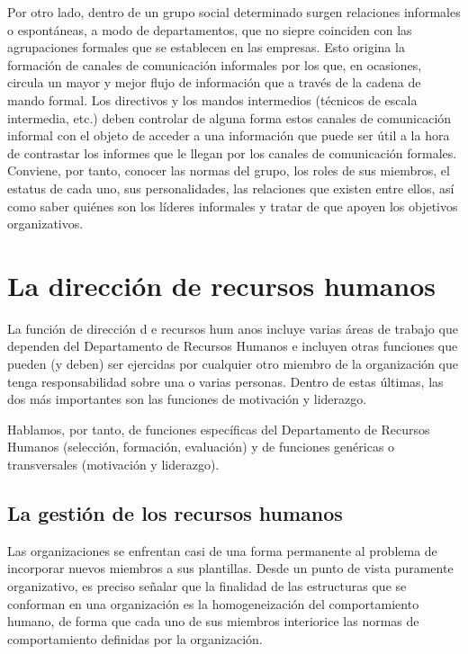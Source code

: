 \documentclass[
]{krantz}
\begin{document}
Por otro lado, dentro de un grupo social determinado surgen relaciones informales o espontáneas, a modo de departamentos, que no siepre coinciden con las agrupaciones formales que se establecen en las empresas. Esto origina la formación de canales de comunicación informales por los que, en ocasiones, circula un mayor y mejor flujo de información que a través de la cadena de mando formal. Los directivos y los mandos intermedios (técnicos de escala intermedia, etc.) deben controlar de alguna forma estos canales de comunicación informal con el objeto de acceder a una información que puede ser útil a la hora de contrastar los informes que le llegan por los canales de comunicación formales. Conviene, por tanto, conocer las normas del grupo, los roles de sus miembros, el estatus de cada uno, sus personalidades, las relaciones que existen entre ellos, así como saber quiénes son los líderes informales y tratar de que apoyen los objetivos organizativos.

\hypertarget{la-direcciuxf3n-de-recursos-humanos}{%
\chapter{La dirección de recursos humanos}\label{la-direcciuxf3n-de-recursos-humanos}}

La función de dirección d e recursos hum anos incluye varias áreas de trabajo que dependen del Departamento de Recursos Humanos e incluyen otras funciones que pueden (y deben) ser ejercidas por cualquier otro miembro de la organización que tenga responsabilidad sobre una o varias personas. Dentro de estas últimas, las dos más importantes son las funciones de motivación y liderazgo.

Hablamos, por tanto, de funciones específicas del Departamento de Recursos Humanos (selección, formación, evaluación) y de funciones genéricas o transversales (motivación y liderazgo).

\hypertarget{la-gestiuxf3n-de-los-recursos-humanos}{%
\section{La gestión de los recursos humanos}\label{la-gestiuxf3n-de-los-recursos-humanos}}

Las organizaciones se enfrentan casi de una forma permanente al problema de incorporar nuevos miembros a sus plantillas. Desde un punto de vista puramente organizativo, es preciso señalar que la finalidad de las estructuras que se conforman en una organización es la homogeneización del comportamiento humano, de forma que cada uno de sus miembros interiorice las normas de comportamiento definidas por la organización.
\end{document}
